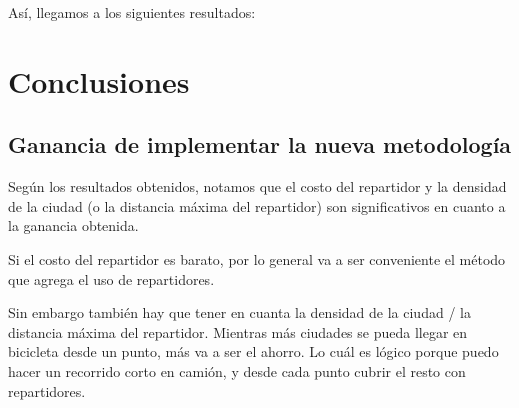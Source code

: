 \documentclass{article}
\begin{document}
    Así, llegamos a los siguientes resultados:

        \begin{table}[H]
    \centering
    \caption{Comparación de tiempos para varias instancias}
    \end{table}

    \section{Conclusiones}
    \subsection{Ganancia de implementar la nueva metodología}
    Según los resultados obtenidos, notamos que el costo del repartidor y la densidad de la ciudad (o la distancia máxima del repartidor) son significativos en cuanto a la ganancia obtenida.

    Si el costo del repartidor es barato, por lo general va a ser conveniente el método que agrega el uso de repartidores.

    Sin embargo también hay que tener en cuanta la densidad de la ciudad / la distancia máxima del repartidor. Mientras más ciudades se pueda llegar en bicicleta desde un punto, más va a ser el ahorro. Lo cuál es lógico porque puedo hacer un recorrido corto en camión, y desde cada punto cubrir el resto con repartidores.
\end{document}
